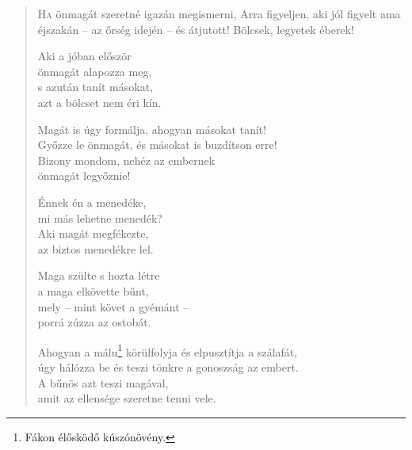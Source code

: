 
\begin{verse}

{\par%
\lettrine{H}{a} {\LettrineTextFont önmagát szeretné igazán megismerni,}\newline
Arra figyeljen, aki jól figyelt\newline
ama éjszakán – az őrség idején – és átjutott!\verselinebreak
Bölcsek, legyetek éberek!
\par}

 Aki a jóban először\\
önmagát alapozza meg,\\
s azután tanít másokat,\\
azt a bölcset nem éri kín.

 Magát is úgy formálja, ahogyan másokat tanít!\\
Győzze le önmagát, és másokat is buzdítson erre!\\
Bizony mondom, nehéz az embernek\\
önmagát legyőznie!

 Énnek én a menedéke,\\
mi más lehetne menedék?\\
Aki magát megfékezte,\\
az biztos menedékre lel.

 Maga szülte s hozta létre\\
a maga elkövette bűnt,\\
mely – mint követ a gyémánt –\\
porrá zúzza az ostobát.

 Ahogyan a málu\footnote{Fákon élősködő kúszónövény.} körülfolyja és elpusztítja a szálafát,\\
úgy hálózza be és teszi tönkre a gonoszság az embert.\\
A bűnös azt teszi magával,\\
amit az ellensége szeretne tenni vele.


\end{verse}
